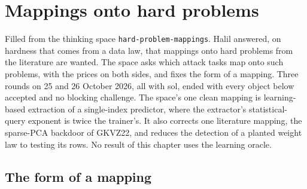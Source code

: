 \chapter{Mappings onto hard problems}\label{ch:hard-problem-mappings}
Filled from the thinking space \texttt{hard-problem-mappings}. Halil answered, on
hardness that comes from a data law, that mappings onto hard problems from the
literature are wanted. The space asks which attack tasks map onto such problems, with
the prices on both sides, and fixes the form of a mapping. Three rounds on 25 and 26
October 2026, all with sol, ended with every object below accepted and no blocking
challenge. The space's one clean mapping is learning-based extraction of a single-index
predictor, where the extractor's statistical-query exponent is twice the trainer's. It
also corrects one literature mapping, the sparse-PCA backdoor of GKVZ22, and reduces
the detection of a planted weight law to testing its rows. No result of this chapter
uses the learning oracle.

\section{The form of a mapping}


